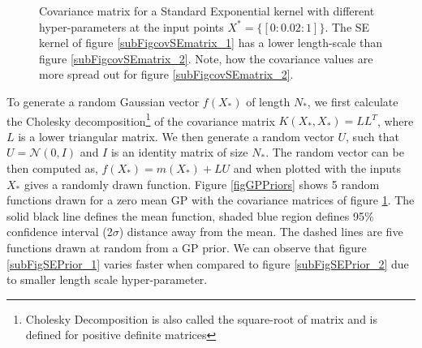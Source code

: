 \begin{figure}[!ht]
  \centering
    \quad
{}\quad
  
       \caption{Covariance matrix for a Standard Exponential kernel with different hyper-parameters at the input points \(X^{*} = \{[0:0.02:1]\}\). The SE kernel of figure \ref{subFigcovSEmatrix_1} has a lower length-scale than figure \ref{subFigcovSEmatrix_2}. Note, how the covariance values are more spread out for figure \ref{subFigcovSEmatrix_2}.}\label{figGPCovarianceMatrix}
\end{figure}

To generate a random Gaussian vector \(f(X_{*})\) of length \(N_{*}\), we first calculate the Cholesky decomposition\footnote{Cholesky Decomposition is also called the square-root of matrix and is defined for positive definite matrices} of the covariance matrix \(K(X_{*}, X_{*}) = LL^{T}\), where \(L\) is a lower triangular matrix. We then generate a random vector \(U\), such that \(U = \mathcal{N}(0, I)\) and \(I\) is an identity matrix of size \(N_{*}\).  The random vector can be then computed as, \(f(X_{*}) = m(X_{*}) + LU\) and when plotted with the inputs \(X_{*}\) gives a randomly drawn function. Figure \ref{figGPPriors} shows 5 random functions drawn for a zero mean GP with the covariance matrices of figure \ref{figGPCovarianceMatrix}. The solid black line defines the mean function, shaded blue region defines 95\% confidence interval (2\(\sigma\)) distance away from the mean. The dashed lines are five functions drawn at random from a GP prior. We can observe that figure \ref{subFigSEPrior_1} varies faster when compared to figure \ref{subFigSEPrior_2} due to smaller length scale hyper-parameter. 

